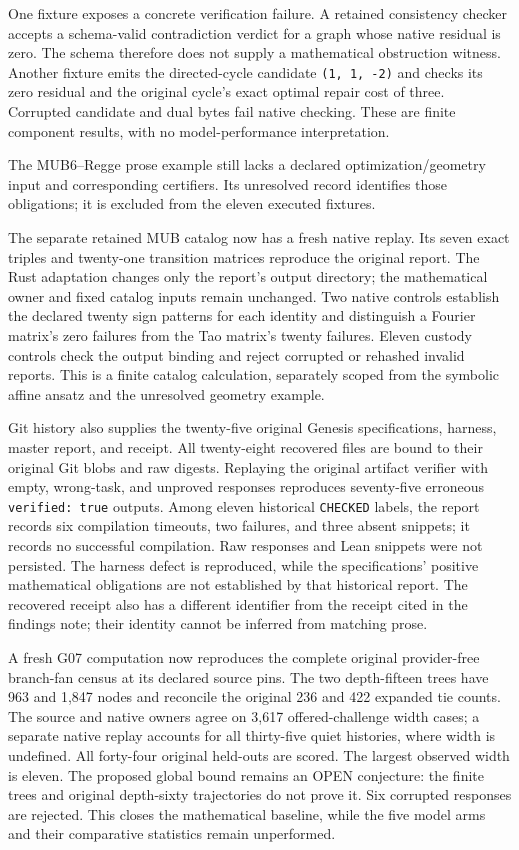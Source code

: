 \documentclass[
  11pt,
]{article}
\begin{document}
One fixture exposes a concrete verification failure. A retained
consistency checker accepts a schema-valid contradiction verdict for a
graph whose native residual is zero. The schema therefore does not
supply a mathematical obstruction witness. Another fixture emits the
directed-cycle candidate \texttt{(1, 1, -\allowbreak{}2)} and checks its
zero residual and the original cycle's exact optimal repair cost of
three. Corrupted candidate and dual bytes fail native checking. These
are finite component results, with no model-performance interpretation.

The MUB6--Regge prose example still lacks a declared
optimization/geometry input and corresponding certifiers. Its unresolved
record identifies those obligations; it is excluded from the eleven
executed fixtures.

The separate retained MUB catalog now has a fresh native replay. Its
seven exact triples and twenty-one transition matrices reproduce the
original report. The Rust adaptation changes only the report's output
directory; the mathematical owner and fixed catalog inputs remain
unchanged. Two native controls establish the declared twenty sign
patterns for each identity and distinguish a Fourier matrix's zero
failures from the Tao matrix's twenty failures. Eleven custody controls
check the output binding and reject corrupted or rehashed invalid
reports. This is a finite catalog calculation, separately scoped from
the symbolic affine ansatz and the unresolved geometry example.

Git history also supplies the twenty-five original Genesis
specifications, harness, master report, and receipt. All twenty-eight
recovered files are bound to their original Git blobs and raw digests.
Replaying the original artifact verifier with empty, wrong-task, and
unproved responses reproduces seventy-five erroneous
\texttt{verified: true} outputs. Among eleven historical
\texttt{CHECKED} labels, the report records six compilation timeouts,
two failures, and three absent snippets; it records no successful
compilation. Raw responses and Lean snippets were not persisted. The
harness defect is reproduced, while the specifications' positive
mathematical obligations are not established by that historical report.
The recovered receipt also has a different identifier from the receipt
cited in the findings note; their identity cannot be inferred from
matching prose.

A fresh G07 computation now reproduces the complete original
provider-free branch-fan census at its declared source pins. The two
depth-fifteen trees have 963 and 1,847 nodes and reconcile the original
236 and 422 expanded tie counts. The source and native owners agree on
3,617 offered-challenge width cases; a separate native replay accounts
for all thirty-five quiet histories, where width is undefined. All
forty-four original held-outs are scored. The largest observed width is
eleven. The proposed global bound remains an OPEN conjecture: the finite
trees and original depth-sixty trajectories do not prove it. Six
corrupted responses are rejected. This closes the mathematical baseline,
while the five model arms and their comparative statistics remain
unperformed.
\end{document}
